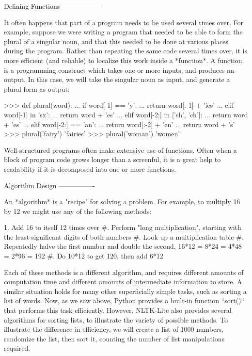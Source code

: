 \documentclass[presentation]{beamer}
\begin{document}
Defining Functions
------------------

It often happens that part of a program needs to be used several times over.
For example, suppose we were writing a program that needed to be able to form
the plural of a singular noun, and that this needed to be done at various
places during the program.  Rather than repeating the same code several times
over, it is more efficient (and reliable) to localize this work inside a *function*.
A function is a programming construct which takes one or more inputs, and produces
an output.  In this case, we will take the singular noun as input, and generate a
plural form as output:

  >>> def plural(word):
  ...     if word[-1] == 'y':
  ...         return word[:-1] + 'ies'
  ...     elif word[-1] in 'sx':
  ...         return word + 'es'
  ...     elif word[-2:] in ['sh', 'ch']:
  ...         return word + 'es'
  ...     elif word[-2:] == 'an':
  ...         return word[:-2] + 'en'
  ...     return word + 's'
  >>> plural('fairy')
  'fairies'
  >>> plural('woman')
  'women'

Well-structured programs often make extensive use of functions.  Often when a block
of program code grows longer than a screenful, it is a great help to readability if
it is decomposed into one or more functions.

Algorithm Design
----------------

An *algorithm* is a "recipe" for solving a problem.  For example,
to multiply 16 by 12 we might use any of the following methods:

1. Add 16 to itself 12 times over
#. Perform "long multiplication", starting with the least-significant
   digits of both numbers
#. Look up a multiplication table
#. Repeatedly halve the first number and double the second,
   16*12 = 8*24 = 4*48 = 2*96 = 192
#. Do 10*12 to get 120, then add 6*12

Each of these methods is a different algorithm, and requires different
amounts of computation time and different amounts of intermediate
information to store.  A similar situation holds for many other
superficially simple tasks, such as sorting a list of words.  Now, as
we saw above, Python provides a built-in function ``sort()`` that
performs this task efficiently.  However, NLTK-Lite also provides
several algorithms for sorting lists, to illustrate the variety of
possible methods.  To illustrate the difference in efficiency, we
will create a list of 1000 numbers, randomize the list, then sort it,
counting the number of list manipulations required.
\end{document}
